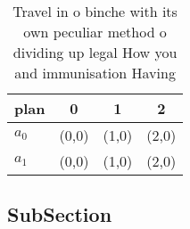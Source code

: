 \documentclass[a4paper]{article}
\begin{document}
\begin{table}
\begin{adjustbox}{width=0.5\columnwidth}
\begin{tabular}{|l|l|l|l|}
\hline
\textbf{plan} & \multicolumn{1}{c|}{\textbf{0}} & \multicolumn{1}{c|}{\textbf{1}} & \multicolumn{1}{c|}{\textbf{2}} \\ \hline
\textbf{$a_0$}  & (0,0) & (1,0) & (2,0) \\ \hline
\textbf{$a_1$}  & (0,0) & (1,0) & (2,0) \\ \hline
\end{tabular}
\end{adjustbox}
\caption{Travel in o binche with its own peculiar method o dividing up legal How you and immunisation Having
}
\end{table}

\subsection{SubSection}
\end{document}
